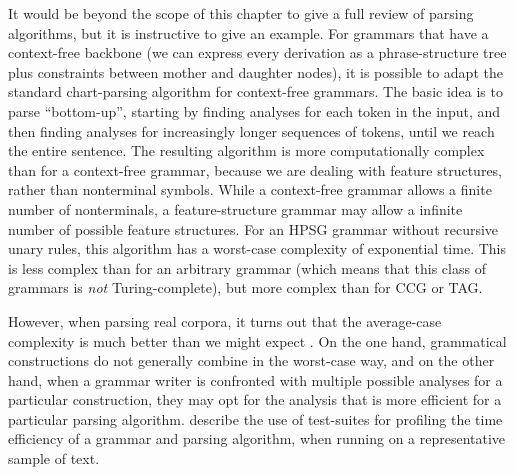 \documentclass[output=paper,nonflat]{langsci/langscibook}
\begin{document}
It would be beyond the scope of this chapter
to give a full review of parsing algorithms,
but it is instructive to give an example.
For grammars that have a context-free backbone
(we can express every derivation as a phrase-structure tree
plus constraints between mother and daughter nodes),
it is possible to adapt the standard chart-parsing algorithm for context-free grammars.
The basic idea is to parse ``bottom-up'', %
starting by finding analyses for each token in the input,
and then finding analyses for increasingly longer sequences of tokens,
until we reach the entire sentence.
The resulting algorithm is more computationally complex than for a context-free grammar,
because we are dealing with feature structures, rather than nonterminal symbols.
While a context-free grammar allows a finite number of nonterminals,
a feature-structure grammar may allow a infinite number of possible feature structures.
For an HPSG grammar without recursive unary rules,
this algorithm has a worst-case complexity of exponential time.
This is less complex than for an arbitrary grammar
(which means that this class of grammars is \emph{not} Turing-complete),
but more complex than for CCG or TAG.

However, when parsing real corpora,
it turns out that the average-case complexity is much better than we might expect \citep{Carroll94}.
On the one hand, grammatical constructions do not generally combine in the worst-case way,
and on the other hand, when a grammar writer is confronted
with multiple possible analyses for a particular construction,
they may opt for the analysis that is more efficient for a particular parsing algorithm.
\citet{OF98} describe the use of test-suites for profiling
the time efficiency of a grammar and parsing algorithm,
when running on a representative sample of text.

\end{document}
